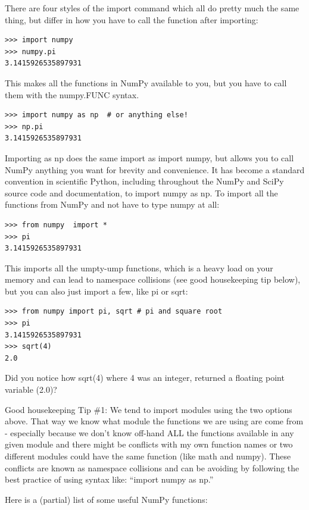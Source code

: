 \documentclass[11pt]{book}
\begin{document}
{{{There are four styles of the import command which all do pretty much the same thing, but differ in how you have to call the function after importing:

{ \color{blue} \begin{verbatim}
>>> import numpy
>>> numpy.pi
3.1415926535897931
\end{verbatim}}
\noindent
This makes all the functions in NumPy available to you, but you have to call them with the {\color{blue}numpy.FUNC} syntax.

{ \color{blue} \begin{verbatim}
>>> import numpy as np  # or anything else!
>>> np.pi
3.1415926535897931
\end{verbatim}}
\noindent
Importing as np does the same import as import numpy, but allows you to call NumPy anything you want for brevity and convenience. It has become a standard convention in scientific Python, including throughout the NumPy and SciPy source code and documentation, to import numpy as np.
\noindent
To import all the functions from NumPy and not have to type numpy at all:
{ \color{blue} \begin{verbatim}
>>> from numpy  import *
>>> pi
3.1415926535897931
\end{verbatim}}
\noindent
This imports all the umpty-ump functions, which is a heavy load on your memory and can lead to namespace collisions (see good housekeeping tip below),  but you can also just import a few, like {\color{blue}pi} or {\color{blue}sqrt}:
{ \color{blue} \begin{verbatim}
>>> from numpy import pi, sqrt # pi and square root
>>> pi
3.1415926535897931
>>> sqrt(4)
2.0
\end{verbatim}
}
\noindent
Did you notice how {\color{blue}sqrt(4)} where 4 was an integer, returned a floating point variable (2.0)?

{\color{magenta}Good housekeeping Tip \#1: We tend to import modules using the two options above.  That way we know what module the functions we are using are come from - especially because we don't know off-hand ALL the functions available in any given module and there might be conflicts with my own function names or two different modules could have the same function (like} {\color{blue}math} {\color{magenta}and }{\color{blue}numpy}). These conflicts are known as namespace collisions and can be avoiding by following the best practice of using syntax like: ``import numpy as np.''


Here is a (partial) list of some useful {\color{blue}NumPy} functions:


}}}
\end{document}
